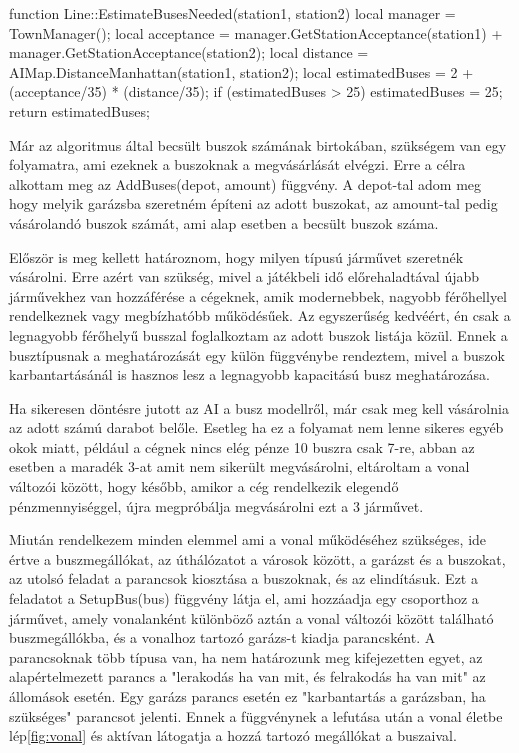 \begin{cpp}
function Line::EstimateBusesNeeded(station1, station2)
{
  local manager = TownManager();
  local acceptance = manager.GetStationAcceptance(station1) +
   manager.GetStationAcceptance(station2);
  local distance = AIMap.DistanceManhattan(station1, station2);
  local estimatedBuses = 2 + (acceptance/35) * (distance/35);
  if (estimatedBuses > 25) {
    estimatedBuses = 25;
  }
  return estimatedBuses;
}
\end{cpp}

Már az algoritmus által becsült buszok számának birtokában, szükségem van egy folyamatra, ami ezeknek a buszoknak a megvásárlását elvégzi. Erre a célra alkottam meg az AddBuses(depot, amount) függvény. A depot-tal adom meg hogy melyik garázsba szeretném építeni az adott buszokat, az amount-tal pedig vásárolandó buszok számát, ami alap esetben a becsült buszok száma.

Először is meg kellett határoznom, hogy milyen típusú járművet szeretnék vásárolni. Erre azért van szükség, mivel a játékbeli idő előrehaladtával újabb járművekhez van hozzáférése a cégeknek, amik modernebbek, nagyobb férőhellyel rendelkeznek vagy megbízhatóbb működésűek. Az egyszerűség kedvéért, én csak a legnagyobb férőhelyű busszal foglalkoztam az adott buszok listája közül. Ennek a busztípusnak a meghatározását egy külön függvénybe rendeztem, mivel a buszok karbantartásánál is hasznos lesz a legnagyobb kapacitású busz meghatározása.

Ha sikeresen döntésre jutott az AI a busz modellről, már csak meg kell vásárolnia az adott számú darabot belőle. Esetleg ha ez a folyamat nem lenne sikeres egyéb okok miatt, például a cégnek nincs elég pénze 10 buszra csak 7-re, abban az esetben a maradék 3-at amit nem sikerült megvásárolni, eltároltam a vonal változói között, hogy később, amikor a cég rendelkezik elegendő pénzmennyiséggel, újra megpróbálja megvásárolni ezt a 3 járművet.

Miután rendelkezem minden elemmel ami a vonal működéséhez szükséges, ide értve a buszmegállókat, az úthálózatot a városok között, a garázst és a buszokat, az utolsó feladat a parancsok kiosztása a buszoknak, és az elindításuk. Ezt a feladatot a SetupBus(bus) függvény látja el, ami hozzáadja egy csoporthoz a járművet, amely vonalanként különböző aztán a vonal változói között található buszmegállókba, és a vonalhoz tartozó garázs-t kiadja parancsként. A parancsoknak több típusa van, ha nem határozunk meg kifejezetten egyet, az alapértelmezett parancs a "lerakodás ha van mit, és felrakodás ha van mit" az állomások esetén. Egy garázs parancs esetén ez "karbantartás a garázsban, ha szükséges" parancsot jelenti. Ennek a függvénynek a lefutása után a vonal életbe lép\ref{fig:vonal} és aktívan látogatja a hozzá tartozó megállókat a buszaival.


